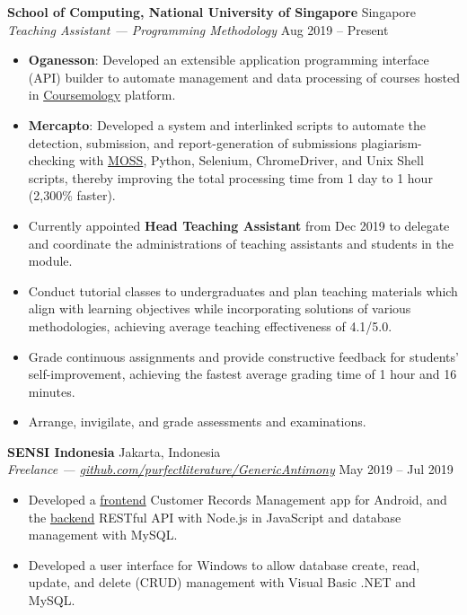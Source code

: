 \documentclass[a4paper, 11pt]{article}
\newcommand{\intraspace}{\vspace{5pt}}
\begin{document}
	\intraspace
	
	\textbf{School of Computing, National University of Singapore} \hfill Singapore\\
	\textit{Teaching Assistant --- Programming Methodology} \hfill Aug 2019 -- Present
	\begin{itemize}[leftmargin=*, noitemsep, topsep=0pt]
		\item \textbf{Oganesson}: Developed an extensible application programming interface (API) builder to automate management and data processing of courses hosted in \href{https://coursemology.org}{Coursemology} platform.
		\item \textbf{Mercapto}: Developed a system and interlinked scripts to automate the detection, submission, and report-generation of submissions plagiarism-checking with \href{http://theory.stanford.edu/~aiken/moss/}{MOSS}, Python, Selenium, ChromeDriver, and Unix Shell scripts, thereby improving the total processing time from 1 day to 1 hour (2,300\% faster).
		\item Currently appointed \textbf{Head Teaching Assistant} from Dec 2019 to delegate and coordinate the administrations of teaching assistants and students in the module.
		\item Conduct tutorial classes to undergraduates and plan teaching materials which align with learning objectives while incorporating solutions of various methodologies, achieving average teaching effectiveness of 4.1/5.0.
		\item Grade continuous assignments and provide constructive feedback for students’ self-improvement, achieving the fastest average grading time of 1 hour and 16 minutes.
		\item Arrange, invigilate, and grade assessments and examinations.
	\end{itemize}
	
	\intraspace
	
	\textbf{SENSI Indonesia} \hfill Jakarta, Indonesia\\
	\textit{Freelance --- \href{https://github.com/purfectliterature/GenericAntimony}{github.com/purfectliterature/GenericAntimony}} \hfill May 2019 -- Jul 2019
	\begin{itemize}[leftmargin=*, noitemsep, topsep=0pt]
		\item Developed a \href{https://github.com/purfectliterature/GenericAntimony}{frontend} Customer Records Management app for Android, and the \href{https://github.com/purfectliterature/GenericAntimonyBackend}{backend} RESTful API with Node.js in JavaScript and database management with MySQL.
		\item Developed a user interface for Windows to allow database create, read, update, and delete (CRUD) management with Visual Basic .NET and MySQL.
	\end{itemize}
	
\end{document}
